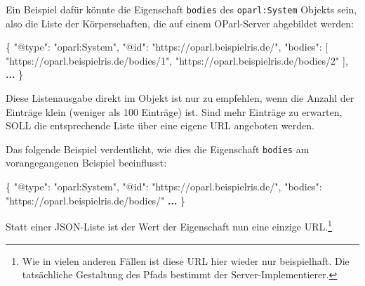 \documentclass[,a4paper]{article}
\newenvironment{Shaded}{}{}
\newcommand{\DataTypeTok}[1]{\textcolor[rgb]{0.56,0.13,0.00}{{#1}}}
\newcommand{\StringTok}[1]{\textcolor[rgb]{0.25,0.44,0.63}{{#1}}}
\newcommand{\OtherTok}[1]{\textcolor[rgb]{0.00,0.44,0.13}{{#1}}}
\newcommand{\FunctionTok}[1]{\textcolor[rgb]{0.02,0.16,0.49}{{#1}}}
\newcommand{\ErrorTok}[1]{\textcolor[rgb]{1.00,0.00,0.00}{\textbf{{#1}}}}
\begin{document}
Ein Beispiel dafür könnte die Eigenschaft \texttt{bodies} des
\texttt{oparl:System} Objekts sein, also die Liste der Körperschaften,
die auf einem OParl-Server abgebildet werden:

\begin{Shaded}
\begin{Highlighting}[]
\FunctionTok{\{}
    \DataTypeTok{"@type"}\FunctionTok{:} \StringTok{"oparl:System"}\FunctionTok{,}
    \DataTypeTok{"@id"}\FunctionTok{:} \StringTok{"https://oparl.beispielris.de/"}\FunctionTok{,}
    \DataTypeTok{"bodies"}\FunctionTok{:} \OtherTok{[}
        \StringTok{"https://oparl.beispielris.de/bodies/1"}\OtherTok{,}
        \StringTok{"https://oparl.beispielris.de/bodies/2"}
    \OtherTok{]}\FunctionTok{,}
    \ErrorTok{...}
\FunctionTok{\}}
\end{Highlighting}
\end{Shaded}

Diese Listenausgabe direkt im Objekt ist nur zu empfehlen, wenn die
Anzahl der Einträge klein (weniger als 100 Einträge) ist. Sind mehr
Einträge zu erwarten, SOLL die entsprechende Liste über eine eigene URL
angeboten werden.

Das folgende Beispiel verdeutlicht, wie dies die Eigenschaft
\texttt{bodies} am vorangegangenen Beispiel beeinflusst:

\begin{Shaded}
\begin{Highlighting}[]
\FunctionTok{\{}
    \DataTypeTok{"@type"}\FunctionTok{:} \StringTok{"oparl:System"}\FunctionTok{,}
    \DataTypeTok{"@id"}\FunctionTok{:} \StringTok{"https://oparl.beispielris.de/"}\FunctionTok{,}
    \DataTypeTok{"bodies"}\FunctionTok{:} \StringTok{"https://oparl.beispielris.de/bodies/"}
    \ErrorTok{...}
\FunctionTok{\}}
\end{Highlighting}
\end{Shaded}

Statt einer JSON-Liste ist der Wert der Eigenschaft nun eine einzige
URL.\footnote{Wie in vielen anderen Fällen ist diese URL hier wieder nur
  beispielhaft. Die tatsächliche Gestaltung des Pfads bestimmt der
  Server-Implementierer.}

\end{document}
